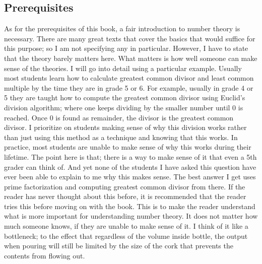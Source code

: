 \documentclass[12pt,leqno,]{book}
\renewcommand{\thechapter}{\Roman{chapter}}
\theoremstyle{definition}
\theoremstyle{definition}
\begin{document}
	\subsection*{Prerequisites}
	As for the prerequisites of this book, a fair introduction to number theory is necessary. There are many great texts that cover the basics that would suffice for this purpose; so I am not specifying any in particular. However, I have to state that the theory barely matters here. What matters is how well someone can make sense of the theories. I will go into detail using a particular example. Usually most students learn how to calculate greatest common divisor and least common multiple by the time they are in grade 5 or 6. For example, usually in grade 4 or 5 they are taught how to compute the greatest common divisor using Euclid's division algorithm; where one keeps dividing by the smaller number until 0 is reached. Once 0 is found as remainder, the divisor is the greatest common divisor. I prioritize on students making sense of why this division works rather than just using this method as a technique and knowing that this works. In practice, most students are unable to make sense of why this works during their lifetime. The point here is that; there is a way to make sense of it that even a 5th grader can think of. And yet none of the students I have asked this question have ever been able to explain to me why this makes sense. The best answer I get uses prime factorization and computing greatest common divisor from there. If the reader has never thought about this before, it is recommended that the reader tries this before moving on with the book. This is to make the reader understand what is more important for understanding number theory. It does not matter how much someone knows, if they are unable to make sense of it. I think of it like a bottleneck; to the effect that regardless of the volume inside bottle, the output when pouring will still be limited by the size of the cork that prevents the contents from flowing out.
	\frontmatter
    \tableofcontents
    
    \printnomenclature
    \mainmatter
    \pagestyle{fancy}
	\setcounter{chapter}{0}
	
	
	
	
	
	
	
	
	
	\pagestyle{empty}
	
	\backmatter
	\printglossary[title=Glossary,]
	\printbibliography[type=article,title=Articles,]
	\printbibliography[filter=books,title=Books,]
    \printindex
\end{document}
